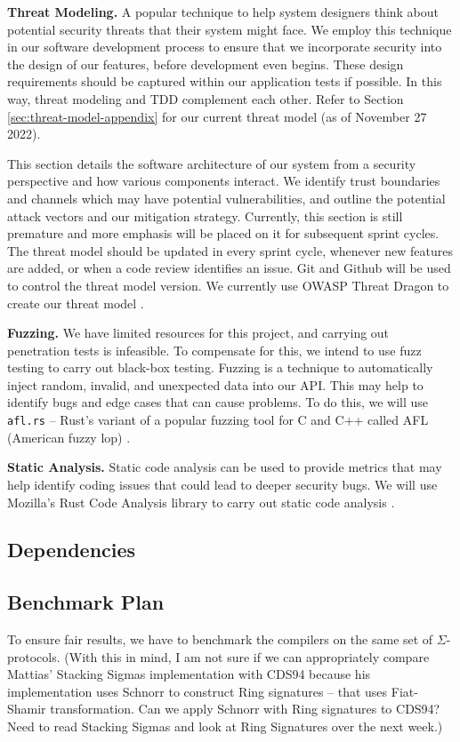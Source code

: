 \textbf{Threat Modeling.} A popular technique to help system designers think about potential security threats that their system might face. We employ this technique in our software development process to ensure that we incorporate security into the design of our features, before development even begins. These design requirements should be captured within our application tests if possible. In this way, threat modeling and TDD complement each other. Refer to Section \ref{sec:threat-model-appendix} for our current threat model (as of November 27 2022). 
    
This section details the software architecture of our system from a security perspective and how various components interact. We identify trust boundaries and channels which may have potential vulnerabilities, and outline the potential attack vectors and our mitigation strategy. Currently, this section is still premature and more emphasis will be placed on it for subsequent sprint cycles. The threat model should be updated in every sprint cycle, whenever new features are added, or when a code review identifies an issue. Git and Github will be used to control the threat model version. We currently use OWASP Threat Dragon to create our threat model \cite{OWASP-Dragonv1.6}. 


\textbf{Fuzzing.} We have limited resources for this project, and carrying out penetration tests is infeasible. To compensate for this, we intend to use fuzz testing to carry out black-box testing. Fuzzing is a technique to automatically inject random, invalid, and unexpected data into our API. This may help to identify bugs and edge cases that can cause problems. To do this, we will use \texttt{afl.rs} \cite{AFL-Rust} -- Rust's variant of a popular fuzzing tool for C and C++ called AFL (American fuzzy lop) \cite{AFL}.

\textbf{Static Analysis.} Static code analysis can be used to provide metrics that may help identify coding issues that could lead to deeper security bugs. We will use Mozilla's Rust Code Analysis library to carry out static code analysis \cite{ARDITO2020100635}.




\subsection{Dependencies}
\label{sec:dependencies}



\subsection{Benchmark Plan}
\label{sec:benchmarks}
To ensure fair results, we have to benchmark the compilers on the same set of $\Sigma$-protocols. (With this in mind, I am not sure if we can appropriately compare Mattias' Stacking Sigmas implementation with CDS94 because his implementation uses Schnorr to construct Ring signatures -- that uses Fiat-Shamir transformation. Can we apply Schnorr with Ring signatures to CDS94? Need to read Stacking Sigmas and look at Ring Signatures over the next week.) 

